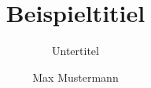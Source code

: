 \documentclass[a4paper,11pt]{tubsreprt}
\title{Beispieltitiel}
\subtitle{Untertitel}
\author{Max Mustermann}
\begin{document}
\maketitle
~\newpage
\end{document}
